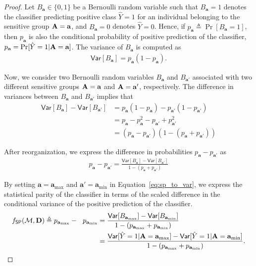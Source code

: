 \begin{proof}
	
	Let $ B_{\mathbf{a}} \in \{0, 1\} $ be a Bernoulli random variable such that $ B_{\mathbf{a}} = 1 $ denotes the classifier predicting positive class $ \hat{Y} = 1 $ for an individual belonging to the sensitive group $ \mathbf{A} = \mathbf{a} $, and $ B_{\mathbf{a}} = 0 $ denotes $ \hat{Y} = 0 $. Hence, if $ p_\mathbf{a} \triangleq \Pr[B_\mathbf{a} = 1] $, then $ p_\mathbf{a} $ is also the conditional probability of positive prediction of the classifier,  $ p_\mathbf{a} = \Pr[\hat{Y} = 1 |  \mathbf{A} = \mathbf{a}] $. The variance of $ B_{\mathbf{a}} $ is computed as
	\begin{align*}
	\mathsf{Var}[B_\mathbf{a}] = p_{\mathbf{a}}(1 - p_{\mathbf{a}}). 
	\end{align*}
	
	Now, we consider two Bernoulli random variables $ B_\mathbf{a} $ and $ B_\mathbf{a'} $ associated with two different sensitive groups $ \mathbf{A} = \mathbf{a} $ and $ \mathbf{A} = \mathbf{a}' $, respectively. The difference in variances between $ B_\mathbf{a} $ and $ B_\mathbf{a'} $ implies that
	\begin{align*}
	\mathsf{Var}[B_\mathbf{a}] - \mathsf{Var}[B_\mathbf{a'}] &= p_{\mathbf{a}}(1 - p_{\mathbf{a}}) - p_{\mathbf{a'}}(1 - p_{\mathbf{a'}}) \\
	&= p_{\mathbf{a}} - p_{\mathbf{a}}^2 - p_{\mathbf{a'}} + p_{\mathbf{a'}}^2 \\ 
	&= (p_\mathbf{a} -  p_\mathbf{a'}) (1 - (p_\mathbf{a} + p_\mathbf{a'}))
	\end{align*}
	
	After reorganization, we express the difference in probabilities $ p_\mathbf{a} -  p_\mathbf{a'} $ as
	\begin{align}
	\label{eq:sp_to_var}
	p_\mathbf{a} -  p_\mathbf{a'}  = \frac{	\mathsf{Var}[B_\mathbf{a}] - \mathsf{Var}[B_\mathbf{a'}]}{1 - (p_\mathbf{a} + p_\mathbf{a'})}
	\end{align}
	
	
	
	
	By setting $ \mathbf{a} = \mathbf{a}_{\max} $ and $ \mathbf{a'} = \mathbf{a}_{\min} $ in Equation~\eqref{eq:sp_to_var}, we express the statistical parity of the classifier in terms of the scaled difference in the conditional variance of the positive prediction of the classifier. 
	\begin{align}
	f_{\mathsf{SP}}(\mathcal{M}, \mathbf{D}) \triangleq p_{\mathbf{a}_{\max}} -  ~~p_{\mathbf{a}_{\min}}  &= \frac{	\mathsf{Var}[B_{\mathbf{a}_{\max}}] - \mathsf{Var}[B_{\mathbf{a}_{\min}}]}{1 - (p_{\mathbf{a}_{\max}} + p_{\mathbf{a}_{\min}})}\label{eq:sp_var_diff}\\
	&= \frac{	\mathsf{Var}[\hat{Y} = 1| \mathbf{A} = \mathbf{a}_{\max}] - \mathsf{Var}[\hat{Y} = 1| \mathbf{A} = \mathbf{a}_{\min}]}{1 - (p_{\mathbf{a}_{\max}} + p_{\mathbf{a}_{\min}})} \notag.
	\end{align}
	

\end{proof}
